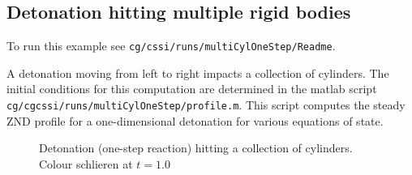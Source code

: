 \newcommand{\Gos}{\Gc_{\rm os}}%
\subsection{Detonation hitting multiple rigid bodies}\label{sec:detMultiCyl}

To run this example see {\tt cg/cssi/runs/multiCylOneStep/Readme}.

A detonation moving from left to right impacts a collection of cylinders.
The initial conditions for this computation are determined in the matlab script {\tt cg/cgcssi/runs/multiCylOneStep/profile.m}.
This script computes the steady ZND profile for a one-dimensional detonation for various equations of state.


{
% 
\newcommand{\figWidth}{12cm}
\newcommand{\trimfig}[2]{\trimFig{#1}{#2}{.05}{.05}{.24}{.28}}
% 
\begin{figure}[htb]
\begin{center}
\end{center}
  \caption{Detonation (one-step reaction) hitting a collection of cylinders. Colour schlieren at $t=1.0$}
  \label{fig:shockMultiCylOneStep}
\end{figure}
}


